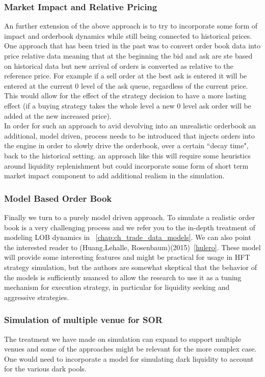 \subsubsection{Market Impact and Relative Pricing}
An further extension of the above approach is to try to incorporate some form of impact and orderbook dynamics while still being connected to historical prices. One approach that has been tried in the past was to convert order book data into price relative data meaning that at the beginning the bid and ask are ste based on historical data but new arrival of orders is converted as relative to the reference price. For example if a sell order at the best ask is entered it will be entered at the current 0 level of the ask queue, regardless of the current price. This would allow for the effect of the strategy decision to have a more lasting effect (if a buying strategy takes the whole level a new 0 level ask order will be added at the new increased price). \\

In order for such an approach to avid devolving into an unrealistic orderbook an additional, model driven, process needs to be introduced that injects orders into the engine in order to slowly drive the orderbook, over a certain ``decay time", back to the historical setting. an approach like this will require some heuristics around liquidity replenishment but could incorporate some form of short term market impact component to add additional realism in the simulation.

\subsubsection{Model Based Order Book}
Finally we turn to a purely model driven approach. To simulate a realistic order book is a very challenging process and we refer you to the in-depth treatment of modeling LOB dynamics in ~\ref{chap:ch_trade_data_models}. We can also point the interested reader to (Huang,Lehalle, Rosenbaum)(2015)~\ref{hulero}. These model will provide some interesting features and might be practical for usage in HFT strategy simulation, but the authors are somewhat skeptical that the behavior of the models is sufficiently nuanced to allow the research to use it as a tuning mechanism for execution strategy, in particular for liquidity seeking and aggressive strategies.

\subsubsection{Simulation of multiple venue for SOR}
The treatment we have made on simulation can expand to support multiple venues and some of the approaches might be relevant for the more complex case. One would need to incorporate a model for simulating dark liquidity to account for the various dark pools. 

